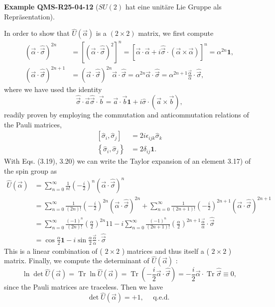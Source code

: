 \documentclass[10pt, letterpaper]{article}
\newcommand{\CustomHeading}[3]{%
  \par\medskip\noindent%
  \textbf{#1 #2} \textnormal{(#3)}.\enskip%
}
\newenvironment{EXA}[2]{\begin{unitbox}\CustomHeading{Example}{#1}{#2}}{\end{unitbox}}
\begin{document}
\begin{EXA}{QMS-R25-04-12}{$SU(2)$ hat eine unitäre Lie Gruppe als Repräsentation}
In order to show that $\hat{U}(\vec{\alpha})$ is a $(2 \times 2)$ matrix, we first compute
$$
\begin{aligned}
(\vec{\alpha} \cdot \hat{\vec{\sigma}})^{2 n} & =\left[(\vec{\alpha} \cdot \hat{\vec{\sigma}})^{2}\right]^{n}=[\vec{\alpha} \cdot \vec{\alpha}+i \hat{\vec{\sigma}} \cdot(\vec{\alpha} \times \vec{\alpha})]^{n}=\alpha^{2 n} \mathbf{1}, \\
(\vec{\alpha} \cdot \hat{\vec{\sigma}})^{2 n+1} & =(\vec{\alpha} \cdot \hat{\vec{\sigma}})^{2 n} \vec{\alpha} \cdot \hat{\vec{\sigma}}=\alpha^{2 n} \vec{\alpha} \cdot \hat{\vec{\sigma}}=\alpha^{2 n+1} \frac{\vec{\alpha}}{\alpha} \cdot \hat{\vec{\sigma}},
\end{aligned}
$$
where we have used the identity
$$
\hat{\vec{\sigma}} \cdot \vec{a} \hat{\vec{\sigma}} \cdot \vec{b}=\vec{a} \cdot \vec{b} \mathbf{1}+i \hat{\sigma} \cdot(\vec{a} \times \vec{b}),
$$
readily proven by employing the commutation and anticommutation relations of the Pauli matrices,
$$
\begin{aligned}
{\left[\hat{\sigma}_{i}, \hat{\sigma}_{j}\right] } & =2 i \epsilon_{i j k} \hat{\sigma}_{k} \\
\left\{\hat{\sigma}_{i}, \hat{\sigma}_{j}\right\} & =2 \delta_{i j} \mathbf{1} .
\end{aligned}
$$
With Eqs. (3.19), 3.20) we can write the Taylor expansion of an element 3.17) of the spin group as
$$
\begin{aligned}
\hat{U}(\vec{\alpha}) & =\sum_{n=0}^{\infty} \frac{1}{n!}\left(-\frac{i}{2}\right)^{n}(\vec{\alpha} \cdot \hat{\vec{\sigma}})^{n} \\
& =\sum_{n=0}^{\infty} \frac{1}{(2 n)!}\left(-\frac{i}{2}\right)^{2 n}(\vec{\alpha} \cdot \hat{\vec{\sigma}})^{2 n}+\sum_{n=0}^{\infty} \frac{1}{(2 n+1)!}\left(-\frac{i}{2}\right)^{2 n+1}(\vec{\alpha} \cdot \hat{\vec{\sigma}})^{2 n+1} \\
& =\sum_{n=0}^{\infty} \frac{(-1)^{n}}{(2 n)!}\left(\frac{\alpha}{2}\right)^{2 n} 11-i \sum_{n=0}^{\infty} \frac{(-1)^{n}}{(2 n+1)!}\left(\frac{\alpha}{2}\right)^{2 n+1} \frac{\vec{\alpha}}{\alpha} \cdot \hat{\vec{\sigma}} \\
& =\cos \frac{\alpha}{2} \mathbf{1}-i \sin \frac{\alpha}{2} \frac{\vec{\alpha}}{\alpha} \cdot \hat{\vec{\sigma}}
\end{aligned}
$$
This is a linear combination of ( $2 \times 2$ ) matrices and thus itself a ( $2 \times 2$ ) matrix. Finally, we compute the determinant of $\hat{U}(\vec{\alpha})$ :
$$
\ln \operatorname{det} \hat{U}(\vec{\alpha})=\operatorname{Tr} \ln \hat{U}(\vec{\alpha})=\operatorname{Tr}\left(-\frac{i}{2} \vec{\alpha} \cdot \hat{\vec{\sigma}}\right)=-\frac{i}{2} \vec{\alpha} \cdot \operatorname{Tr} \hat{\vec{\sigma}} \equiv 0,
$$
since the Pauli matrices are traceless. Then we have
$$
\operatorname{det} \hat{U}(\vec{\alpha})=+1, \quad \text { q.e.d. }
$$
\end{EXA}
\end{document}
